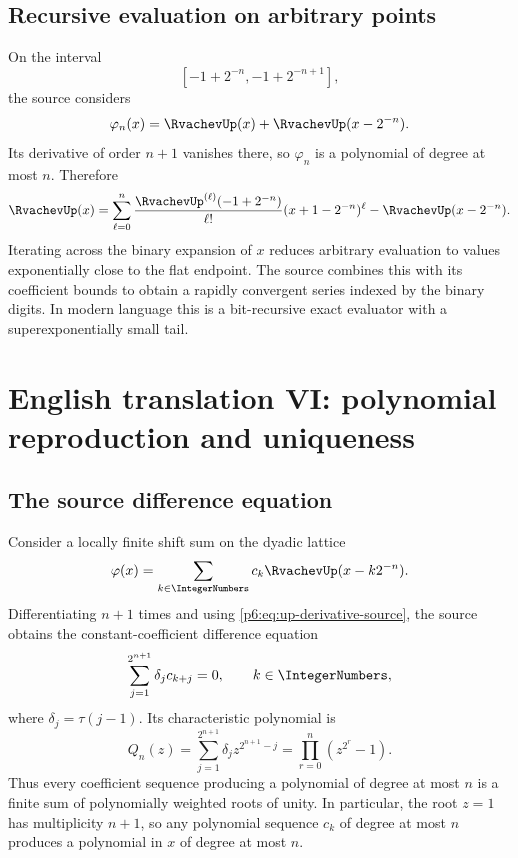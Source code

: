 \documentclass[11pt,oneside]{article}
\numberwithin{equation}{section}
\theoremstyle{definition}
\theoremstyle{remark}
\begin{document}
\subsection{Recursive evaluation on arbitrary points}

On the interval
\[
 [-1+2^{-n},-1+2^{-n+1}],
\]
the source considers
\[
 \varphi_n(x)=\RvachevUp(x)+\RvachevUp(x-2^{-n}).
\]
Its derivative of order $n+1$ vanishes there, so $\varphi_n$ is a polynomial of
degree at most $n$.  Therefore
\begin{equation}\label{p6:eq:up-recursive-cell}
 \RvachevUp(x)=
 \sum_{\ell=0}^{n}
 \frac{\RvachevUp^{(\ell)}(-1+2^{-n})}{\ell!}
 (x+1-2^{-n})^\ell
 -\RvachevUp(x-2^{-n}).
\end{equation}
Iterating across the binary expansion of $x$ reduces arbitrary evaluation to
values exponentially close to the flat endpoint.  The source combines this
with its coefficient bounds to obtain a rapidly convergent series indexed by the
binary digits.  In modern language this is a bit-recursive exact evaluator with
a superexponentially small tail.

\section{English translation VI: polynomial reproduction and uniqueness}

\subsection{The source difference equation}

Consider a locally finite shift sum on the dyadic lattice
\begin{equation}\label{p6:eq:source-shift-sum}
 \varphi(x)=\sum_{k\in\IntegerNumbers}c_k\RvachevUp(x-k2^{-n}).
\end{equation}
Differentiating $n+1$ times and using
\eqref{p6:eq:up-derivative-source}, the source obtains the constant-coefficient
difference equation
\begin{equation}\label{p6:eq:source-difference}
 \sum_{j=1}^{2^{n+1}}\delta_j c_{k+j}=0,
 \qquad k\in\IntegerNumbers,
\end{equation}
where $\delta_j=\tau(j-1)$.  Its characteristic polynomial is
\begin{equation}\label{p6:eq:Qn}
 Q_n(z)=\sum_{j=1}^{2^{n+1}}\delta_j z^{2^{n+1}-j}
 =\prod_{r=0}^{n}(z^{2^r}-1).
\end{equation}
Thus every coefficient sequence producing a polynomial of degree at most $n$
is a finite sum of polynomially weighted roots of unity.  In particular, the
root $z=1$ has multiplicity $n+1$, so any polynomial sequence $c_k$ of degree at
most $n$ produces a polynomial in $x$ of degree at most $n$.
\end{document}

